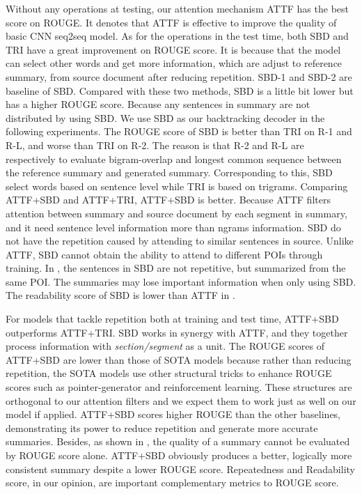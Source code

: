 Without any operations at testing, our attention
mechanism ATTF has the best score on ROUGE. It denotes
that ATTF is effective to improve the quality of basic CNN seq2seq model.
As for the operations in the test time, both SBD and
TRI have a great improvement on ROUGE score.
It is because that the model can select other words and get more information,
which are adjust to reference summary, from source 
document after reducing repetition.
SBD-1 and SBD-2 are baseline of SBD.
Compared with these two methods, SBD is a little bit lower
but has a higher ROUGE score.
Because any sentences in summary are not distributed by using SBD.
We use SBD as our backtracking decoder in the following experiments.
The ROUGE score of SBD 
is better than TRI on R-1 and R-L, and worse than TRI on R-2. 
The reason is that R-2 and R-L are respectively to evaluate
bigram-overlap and longest common sequence between the reference
summary and generated summary. Corresponding to this, 
SBD select words
based on sentence level while TRI is based on trigrams.
Comparing ATTF+SBD and ATTF+TRI, ATTF+SBD is better. 
Because ATTF filters attention between summary and source document
by each segment in summary, and it need sentence level 
information more than 
ngrams information. 
SBD do not have the repetition caused by attending to similar sentences in source.
Unlike ATTF, 
SBD cannot obtain the ability to attend to different POIs through training.
In , the sentences in SBD are not repetitive, 
but summarized from the same POI.
The summaries may lose important information when only using SBD.
The readability score of SBD is lower than ATTF in .

For models that tackle repetition both at training and test time, 
ATTF+SBD outperforms ATTF+TRI.
SBD works in synergy with ATTF, and they together process 
information with \textit{section/segment} as a unit.
The ROUGE scores of ATTF+SBD are lower than
those of SOTA models 
because rather than reducing repetition, the SOTA models use 
other structural tricks to enhance ROUGE scores 
such as pointer-generator and reinforcement learning.
These structures are orthogonal 
to our attention filters
and we expect them to work just as well on our model if applied.
ATTF+SBD scores higher ROUGE than the other baselines, 
demonstrating its power to  reduce 
repetition and generate more accurate summaries.
Besides, as shown in , the quality of a summary cannot be evaluated by
ROUGE score alone.
ATTF+SBD obviously produces a better, logically more consistent summary despite 
a lower ROUGE score.  Repeatedness and Readability score, 
in our opinion, are important complementary metrics to ROUGE score.  

